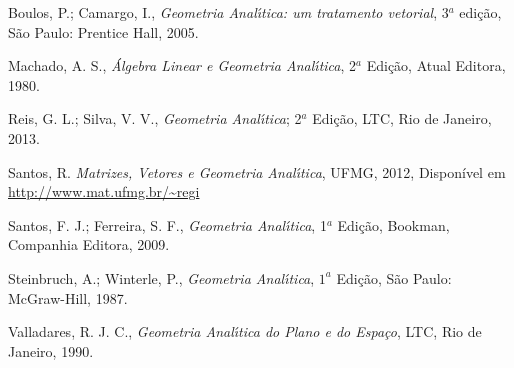 \cleardoublepage
{}
{}
\renewcommand{\bibname}{Bibliografia}

\begin{thebibliography}{99}

Boulos, P.; Camargo, I., \textit{Geometria Anal{\'\i}tica: um tratamento vetorial}, 3$^a$ edi\c{c}\~ao, S\~ao Paulo: Prentice Hall, 2005.

Machado, A. S., \textit{\'Algebra Linear e Geometria Anal{\'\i}tica}, 2$^a$ Edi{\c c}{\~a}o, Atual Editora, 1980.

 Reis, G. L.; Silva, V. V., \textit{Geometria Anal{\'\i}tica}; 2$^a$ Edição, LTC, Rio de Janeiro, 2013.

Santos, R. \textit{Matrizes, Vetores e Geometria Anal{\'\i}tica}, UFMG, 2012, Dispon{\'i}­vel em \url{http://www.mat.ufmg.br/~regi}

Santos, F. J.; Ferreira, S. F., \textit{Geometria Anal{\'\i}tica}, 1$^{a}$ Edi{\c c}{\~a}o, Bookman, Companhia Editora, 2009.

Steinbruch, A.; Winterle, P., \textit{Geometria Anal{\'\i}tica}, $1^a$ Edi{\c c}{\~a}o, S\~ao Paulo: McGraw-Hill, 1987.

 Valladares, R. J. C., \textit{Geometria Anal{\'\i}tica do Plano e do Espa\c{c}o}, LTC, Rio de Janeiro, 1990.

\end{thebibliography}